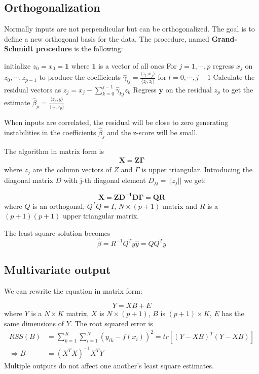 \documentclass[12pt, letterpaper]{article}
\theoremstyle{definition}
\begin{document}
\subsection{Orthogonalization}
Normally inputs are not perpendicular but can be orthogonalized. The goal is to define a new orthogonal basis for the data. The procedure, named \textbf{Grand-Schmidt procedure} is the following:
\begin{algorithm}[!ht]
initialize $z_0=x_0=\mathbf{1}$ where $\mathbf{1}$ is a vector of all ones\;
For $j=1,\cdots, p$ regress $x_j$ on $z_0,\cdots, z_{p-1}$ to produce the coefficients $\hat{\gamma}_{lj}= \frac{\langle z_l , x_j\rangle}{\langle z_l , z_l\rangle}$ for $l=0,\cdots, j-1$\;
Calculate the residual vectors as $z_j = x_j - \sum_{k=0}^{j-1} \hat{\gamma}_{kj}z_k$\;
Regress $\mathbf{y}$ on the residual $z_p$ to get the estimate $\hat{\beta}_p = \frac{\langle z_p, y\rangle}{\langle z_p , z_p\rangle}$
\end{algorithm}
When inputs are correlated, the residual will be close to zero generating instabilities in the coefficients $\hat{\beta}_j$ and the z-score will be small.

The algorithm in matrix form is
\begin{align*}
\mathbf{X = Z\Gamma}
\end{align*}
where $z_j$ are the column vectors of $Z$ and $\Gamma$ is upper triangular. Introducing the diagonal matrix $D$ with j-th diagonal element $D_{jj}=||z_j||$ we get:

\begin{equation}
\mathbf{X = ZD^{-1}D\Gamma = QR}
\end{equation}
where $Q$ is an orthogonal, $Q^TQ=I$, $ N\times(p+1)$ matrix and $R$ is a $(p+1)(p+1)$ upper triangular matrix.

The least square solution becomes 
\begin{equation}
\hat{\beta} = R^{-1}Q^Ty
\hat{y} = QQ^Ty
\end{equation}

\subsection{Multivariate output}
We can rewrite the equation in matrix form:

\begin{equation}
Y = XB + E
\end{equation}
where $Y$ is  a $N\times K$ matrix, $X$ is $N\times(p+1)$, $B$ is $(p+1)\times K$, $E$ has the same dimensions of $Y$.
The root squared error is 
\begin{equation}
\begin{aligned}
RSS(B) &= \sum_{k=1}^K\sum_{i=1}^N\left(y_{ik}-f(x_i)\right)^2 = tr \left[  \left( Y-XB\right)^T\left( Y-XB\right) \right]	\\
\Rightarrow B &= \left( X^TX\right)^{-1}X^TY
\end{aligned}
\end{equation}
Multiple outputs do not affect one another's least square estimates.
\end{document}

